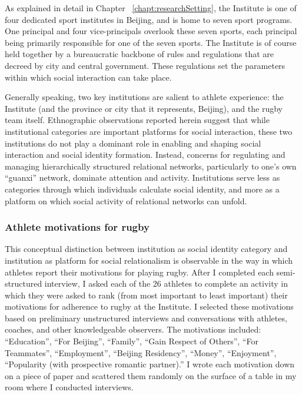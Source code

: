 \begin{CJK}{UTF8}{gbsn}
As explained in detail in Chapter ~\ref{chapt:researchSetting}, the Institute is one of four dedicated sport institutes in Beijing, and is home to seven sport programs.  One principal and four vice-principals overlook these seven sports, each principal being primarily responsible for one of the seven sports.  The Institute is of course held together by a bureaucratic backbone of rules and regulations that are decreed by city and central government.  These regulations set the parameters within which social interaction can take place.

Generally speaking, two key institutions are salient to athlete experience: the Institute (and the province or city that it represents, Beijing), and the rugby team itself.  Ethnographic observations reported herein suggest that while institutional categories are important platforms for social interaction, these two institutions do not play a dominant role in enabling and shaping social interaction and social identity formation.  Instead, concerns for regulating and managing hierarchically structured relational networks, particularly to one's own ``guanxi'' network, dominate attention and activity.  Institutions serve less as categories through which individuals calculate social identity, and more as a platform on which social activity of relational networks can unfold.

\subsubsection{Athlete motivations for rugby}
This conceptual distinction between institution as social identity category and institution as platform for social relationalism is observable in the way in which athletes report their motivations for playing rugby.  After I completed each semi-structured interview, I asked each of the 26 athletes to complete an activity in which they were asked to rank (from most important to least important) their motivations for adherence to rugby at the Institute.  I selected these motivations based on preliminary unstructured interviews and conversations with athletes, coaches, and other knowledgeable observers.  The motivations included: ``Education'', ``For Beijing'', ``Family'', ``Gain Respect of Others'', ``For Teammates'', ``Employment'', ``Beijing Residency'', ``Money'', ``Enjoyment'', ``Popularity (with prospective romantic partner).'' I wrote each motivation down on a piece of paper and scattered them randomly on the surface of a table in my room where I conducted interviews.


\end{CJK}
